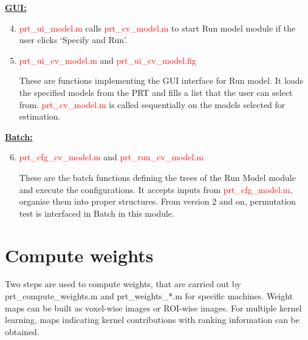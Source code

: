 \noindent \textbf{\underline{GUI:}}

\begin{enumerate}
\setcounter{enumi}{3}

\item \textcolor{red}{prt\_ui\_model.m} calls \textcolor{red}{prt\_cv\_model.m} to start Run model module if the user clicks `Specify and Run'.

\item \textcolor{red}{prt\_ui\_cv\_model.m} and \textcolor{red}{prt\_ui\_cv\_model.fig}

These are functions implementing the GUI interface for Run model. It loads the specified models from the PRT and fills a list that the user can select from. \textcolor{red}{prt\_cv\_model.m} is called sequentially on the models selected for estimation.

\end{enumerate}

\noindent \textbf{\underline{Batch:}}

\begin{enumerate}
\setcounter{enumi}{5}

\item \textcolor{red}{prt\_cfg\_cv\_model.m} and \textcolor{red}{prt\_run\_cv\_model.m}

These are the batch functions defining the trees of the Run Model module and execute the configurations. It accepts inputs from \textcolor{red}{prt\_cfg\_model.m}, organise them into proper structures. From version 2 and on, permutation test is interfaced in Batch in this module.

\end{enumerate}






\section{Compute weights}


Two steps are used to compute weights, that are carried out by prt\_compute\_weights.m and prt\_weights\_*.m for specific machines. Weight maps can be built as voxel-wise images or ROI-wise images. For multiple kernel learning, maps indicating kernel contributions with ranking information can be obtained.
\\

